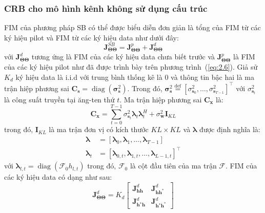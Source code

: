 \subsubsection*{\textbf{CRB cho mô hình kênh không sử dụng cấu trúc}}

FIM của phương pháp SB có thể được biểu diễn đơn giản là tổng của FIM từ các ký hiệu pilot và FIM từ các ký hiệu data như dưới đây:
\begin{equation}
    \label{eq:17}
    \mathbf{J}_{\boldsymbol{\Theta} \boldsymbol{\Theta}}^{SB}= \mathbf{J}_{\boldsymbol{\Theta} \boldsymbol{\Theta}}^{p} + \mathbf{J}_{\boldsymbol{\Theta} \boldsymbol{\Theta}}^{d}
\end{equation}
với $\mathbf{J}_{\boldsymbol{\Theta} \boldsymbol{\Theta}}^{d}$ tương ứng là FIM của các ký hiệu data chưa biết trước và $\mathbf{J}_{\boldsymbol{\Theta} \boldsymbol{\Theta}}^{p}$ là FIM của các ký hiệu pilot như đã được trình bày trên phương trình~(\ref{eq:2.6}). Giả sử $K_d$ ký hiệu data là i.i.d với trung bình thống kê là $0$ và thông tin bậc hai là ma trận hiệp phương sai $\mathbf{C}_{\mathbf{s}}=\operatorname{diag}\left(\boldsymbol{\sigma}^2_{\mathbf{s}}\right)$. Trong đó, $\boldsymbol{\sigma}_{\mathbf{s}}^{2} \stackrel{\operatorname{def}}{=}\left[\sigma_{\mathbf{s}_{0}}^{2}, \ldots, \sigma_{\mathbf{s}_{T-1}}^{2}\right]^\top$ với $\sigma^2_{\mathbf{s}_t}$ là công suất truyền tại ăng-ten thứ $t$. Ma trận hiệp phương sai $\mathbf{C}_{\mathbf{x}}$ là:
\begin{equation}
    \mathbf{C}_{\mathbf{x}}=\sum_{t=0}^{T-1} \sigma_{\mathbf{s}_{t}}^{2} \boldsymbol{\lambda}_{t} \boldsymbol{\lambda}_{t}^{H}+\sigma_{\mathbf{w}}^{2} \mathbf{I}_{K L}
\end{equation}
trong đó, $\mathbf{I}_{KL}$ là ma trận đơn vị có kích thước $K L \times KL$ và $\boldsymbol{\lambda}$ được định nghĩa là:
\begin{equation}
    \begin{aligned}
        \boldsymbol{\lambda} &=\left[\boldsymbol{\lambda}_{0}, \boldsymbol{\lambda}_{1}, \ldots, \boldsymbol{\lambda}_{T-1}\right] \\ 
        \boldsymbol{\lambda}_{t}&=\left[\boldsymbol{\lambda}_{0, t}, \boldsymbol{\lambda}_{1, t}, \ldots, \boldsymbol{\lambda}_{L-1, t}\right]^{\top}
    \end{aligned}
\end{equation}
với $\boldsymbol{\lambda}_{l, t}=\operatorname{diag}\left(\mathcal{F}_0 h_{l, t}\right)$ trong đó, $\mathcal{F}_0$ là cột đầu tiên của ma trận $\mathcal{F}$. FIM của các ký hiệu data có dạng như sau:
\begin{equation}
    \mathbf{J}_{\boldsymbol{\Theta} \boldsymbol{\Theta}}^{d}=K_{d}\left[\begin{array}{cc}
    \mathbf{J}_{\mathbf{h} \mathbf{h}}^{d} & \mathbf{J}_{\mathbf{h} \mathbf{h}^{*}}^{d} \\
    \mathbf{J}_{\mathbf{h}^{\star} \mathbf{h}}^{d} & \mathbf{J}_{\mathbf{h}^{\star} \mathbf{h}^{*}}^{d}
    \end{array}\right]
\end{equation}

